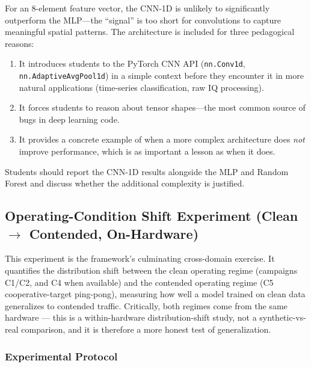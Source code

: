 \documentclass[11pt,letterpaper]{article}
\begin{document}
	\begin{tcolorbox}[infobox={When Does CNN-1D Help?}]
		For an 8-element feature vector, the CNN-1D is unlikely to significantly outperform the MLP---the ``signal'' is too short for convolutions to capture meaningful spatial patterns. The architecture is included for three pedagogical reasons:
		\begin{enumerate}
			\item It introduces students to the PyTorch CNN API (\texttt{nn.Conv1d}, \texttt{nn.AdaptiveAvgPool1d}) in a simple context before they encounter it in more natural applications (time-series classification, raw IQ processing).
			\item It forces students to reason about tensor shapes---the most common source of bugs in deep learning code.
			\item It provides a concrete example of when a more complex architecture does \emph{not} improve performance, which is as important a lesson as when it does.
		\end{enumerate}
		Students should report the CNN-1D results alongside the MLP and Random Forest and discuss whether the additional complexity is justified.
	\end{tcolorbox}

	\subsection{Operating-Condition Shift Experiment (Clean $\to$ Contended, On-Hardware)}
	\label{sec:transfer}

	This experiment is the framework's culminating cross-domain exercise. It quantifies the distribution shift between the clean operating regime (campaigns C1/C2, and C4 when available) and the contended operating regime (C5 cooperative-target ping-pong), measuring how well a model trained on clean data generalizes to contended traffic. Critically, both regimes come from the same hardware --- this is a within-hardware distribution-shift study, not a synthetic-vs-real comparison, and it is therefore a more honest test of generalization.

	\subsubsection{Experimental Protocol}
\end{document}

